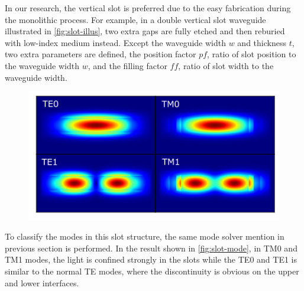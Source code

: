 In our research, the vertical slot is preferred due to the easy fabrication during the monolithic process. 
For example, in a double vertical slot waveguide illustrated in \autoref{fig:slot-illus}, two extra gaps are fully etched and then reburied with low-index medium instead. 
Except the waveguide width $w$ and thickness $t$, two extra parameters are defined, the position factor $ \mathit{pf} $, ratio of slot position to the waveguide width $w$, and the filling factor $ \mathit{ff} $, ratio of slot width to the waveguide width.

\begin{figure}
		\centering	
		
		\label{fig:slot-illus}
\end{figure}


\begin{figure}
	\centering
	\includegraphics[width=.8\linewidth]{imgs/png/slot_mode}
 	\label{fig:slot-mode}
\end{figure}


To classify the modes in this slot structure, the same mode solver mention in previous section is performed.
In the result shown in \autoref{fig:slot-mode}, in TM0 and TM1 modes, the light is confined strongly in the slots while the TE0 and TE1 is similar to the normal TE modes, where the discontinuity is obvious on the upper and lower interfaces.


